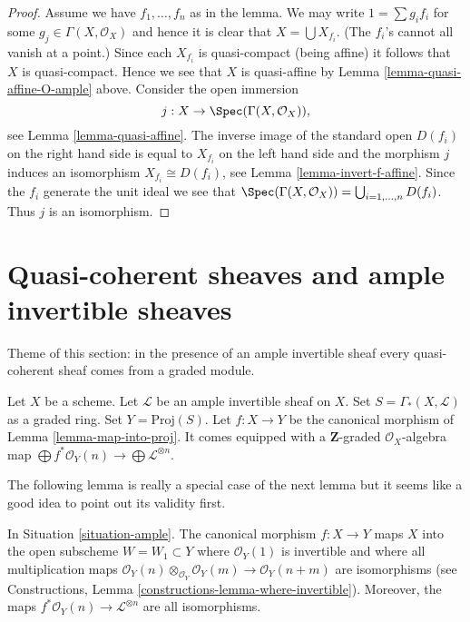 \begin{proof}
Assume we have $f_1, \ldots, f_n$ as in the lemma.
We may write $1 = \sum g_i f_i$ for some $g_j \in \Gamma(X, \mathcal{O}_X)$
and hence it is clear that $X = \bigcup X_{f_i}$. (The $f_i$'s cannot
all vanish at a point.) Since each $X_{f_i}$
is quasi-compact (being affine) it follows that $X$ is quasi-compact.
Hence we see that $X$ is quasi-affine by
Lemma \ref{lemma-quasi-affine-O-ample} above.
Consider the open immersion
$$
j : X \to \Spec(\Gamma(X, \mathcal{O}_X)),
$$
see Lemma \ref{lemma-quasi-affine}. The inverse image of the standard open
$D(f_i)$ on the right hand side is equal to $X_{f_i}$ on the
left hand side and the morphism $j$ induces an isomorphism
$X_{f_i} \cong D(f_i)$, see
Lemma \ref{lemma-invert-f-affine}. Since the $f_i$ generate the unit ideal
we see that $\Spec(\Gamma(X, \mathcal{O}_X))
= \bigcup_{i = 1, \ldots, n} D(f_i)$. Thus $j$ is an isomorphism.
\end{proof}







\section{Quasi-coherent sheaves and ample invertible sheaves}
\label{section-ample-quasi-coherent}

\noindent
Theme of this section: in the presence of an ample invertible sheaf
every quasi-coherent sheaf comes from a graded module.

\begin{situation}
\label{situation-ample}
Let $X$ be a scheme.
Let $\mathcal{L}$ be an ample invertible sheaf on $X$.
Set $S = \Gamma_*(X, \mathcal{L})$ as a graded ring.
Set $Y = \text{Proj}(S)$.
Let $f : X \to Y$ be the canonical morphism of Lemma \ref{lemma-map-into-proj}.
It comes equipped with a $\mathbf{Z}$-graded $\mathcal{O}_X$-algebra map
$\bigoplus f^*\mathcal{O}_Y(n) \to \bigoplus \mathcal{L}^{\otimes n}$.
\end{situation}

\noindent
The following lemma is really a special case of the next lemma
but it seems like a good idea to point out its validity first.

\begin{lemma}
\label{lemma-ample-gcd-is-one}
In Situation \ref{situation-ample}.
The canonical morphism $f : X \to Y$
maps $X$ into the open subscheme $W = W_1 \subset Y$
where $\mathcal{O}_Y(1)$ is invertible and where
all multiplication maps
$\mathcal{O}_Y(n) \otimes_{\mathcal{O}_Y} \mathcal{O}_Y(m) \to
\mathcal{O}_Y(n + m)$
are isomorphisms (see
Constructions, Lemma \ref{constructions-lemma-where-invertible}).
Moreover, the maps $f^*\mathcal{O}_Y(n) \to \mathcal{L}^{\otimes n}$
are all isomorphisms.
\end{lemma}

